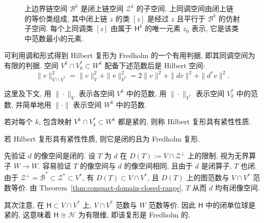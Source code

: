 \begin{figure}[htbp]\centering

\caption{{上边界链空间 $\mathcal B^k$ 是闭上链空间 $\mathcal Z^k$ 的子空间. 上同调空间由闭上链的等价类组成, 其中闭上链 $z$ 的类 $[z]$ 是经过 $z$ 且平行于 $\mathcal B^k$ 的仿射子空间. 每个上同调类 $[z]$ 由属于 $\mathsf H^k$ 的唯一元素 $z_0$ 表示, 它是该类中范数最小的元素.}}\label{fig:cohomology-harmonic-representatives}
\end{figure}

{可利用调和形式得到 Hilbert 复形为 Fredholm 的一个有用判据, 即其同调空间为有限的判据. 空间 $V^k\cap V_k^*\subset W^k$ 配备下述范数后是 Hilbert 空间:}
\[
\|v\|_{V\cap V^*}^2=\|v\|_V^2+\|v\|_{V^*}^2=2\|v\|^2+\|dv\|^2+\|d^*v\|^2.
\]

{这里及下文, 用 $\|\cdot\|_V$ 表示各空间 $V^k$ 中的范数, 用 $\|\cdot\|_{V^*}$ 表示空间 $V_k^*$ 中的范数, 并简单地用 $\|\cdot\|$ 表示空间 $W^k$ 中的范数.}

\begin{Definition}\label{def:hilbert-complex-compactness-property}
{若对每个 $k$, 包含映射 $V^k\cap V_k^*\subset W^k$ 都是紧的, 则称 Hilbert 复形具有紧性性质.}
\end{Definition}

\begin{Theorem}\label{thm:compactness-implies-fredholm}
{若 Hilbert 复形具有紧性性质, 则它是闭的且为 Fredholm 复形.}
\end{Theorem}

\begin{Proof}
{先验证 $d$ 的像空间是闭的. 设 $T$ 为 $d$ 在 $D(T):=V\cap\mathcal Z^\perp$ 上的限制, 视为无界算子 $W\to W$. 容易验证 $T$ 的像空间与 $d$ 的像空间相同, 且由于 $d$ 是闭算子, $T$ 也闭. 由于 $\mathcal Z^\perp=\overline{\mathcal B}^*\subset\mathcal Z^*\subset V^*$, 有 $D(T)\subset V\cap V^*$, 且 $D(T)$ 上的图范数与 $V\cap V^*$ 范数等价. 由 Theorem~\ref{thm:compact-domain-closed-range}, $T$ 从而 $d$ 均有闭像空间.}

{其次注意, 在 $\mathsf H\subset V\cap V^*$ 上, $V\cap V^*$ 范数与 $W$ 范数等价. 因此 $\mathsf H$ 中的闭单位球是紧的, 这意味着 $\mathsf H\cong\mathcal H$ 为有限维, 即该复形是 Fredholm 的.}
\end{Proof}

